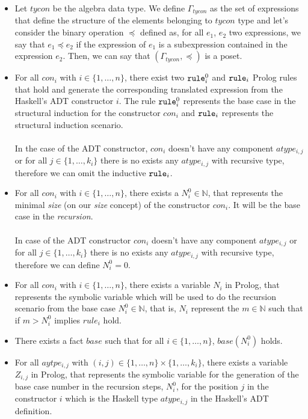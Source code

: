 \begin{itemize}
	\item Let $tycon$ be the algebra data type. We define $\Gamma_{tycon}$ as the set of expressions that define the structure of the elements belonging to $tycon$ type and let's consider the binary operation $\preceq$ defined as, for all $e_1$, $e_2$ two expressions, we say that $e_1 \preceq e_2$ if the expression of $e_1$ is a subexpression contained in the expression $e_2$. Then, we can say that $(\Gamma_{tycon}, \preceq)$ is a poset.
	\item For all $con_i$ with $i \in \{1, \ldots, n \}$, there exist two $\texttt{rule}_{i}^{0}$ and $\texttt{rule}_i$ Prolog rules that hold and generate the corresponding translated expression from the Haskell's ADT constructor $i$. The rule $\texttt{rule}_{i}^{0}$ represents the base case in the structural induction for the constructor $con_i$ and $\texttt{rule}_i$ represents the structural induction scenario.\\\\
	      In the case of the ADT constructor, $con_i$ doesn't have any component $atype_{i,j}$ or for all $j \in \{1, \ldots, k_i \}$ there is no exists any $atype_{i,j}$ with recursive type, therefore we can omit the inductive $\texttt{rule}_i$.
	\item For all $con_i$ with $i \in \{1, \ldots, n \}$, there exists a $N_{i}^{0} \in \mathbb{N}$, that represents the minimal \textit{size} (on our \textit{size} concept) of the constructor $con_i$. It will be the base case in the \textit{recursion}.\\\\
	      In case of the ADT constructor $con_i$ doesn't have any component $atype_{i,j}$ or for all $j \in \{1, \ldots, k_i \}$ there is no exists any $atype_{i,j}$ with recursive type, therefore we can define $N_{i}^{0} = 0$.
	\item For all $con_i$ with $i \in \{1, \ldots, n \}$, there exists a variable $N_i$ in Prolog, that represents the symbolic variable which will be used to do the recursion scenario from the base case $N_{i}^{0} \in \mathbb{N}$, that is, $N_i$ represent the $m \in \mathbb{N}$ such that if $m > N_{i}^{0}$ implies $rule_i$ hold.
	\item There exists a fact $base$ such that for all $i \in \{1, \ldots, n \}$, $base(N_{i}^{0})$ holds.
	\item For all $aytpe_{i,j}$ with $(i,j) \in \{1, \ldots, n \} \times \{1, \ldots, k_i \}$, there exists a variable $Z_{i,j}$ in Prolog, that represents the symbolic variable for the generation of the base case number in the recursion steps, $N_{i}^{0}$, for the position $j$ in the constructor $i$ which is the Haskell type $atype_{i,j}$ in the Haskell's ADT definition.\\\\

\end{itemize}
